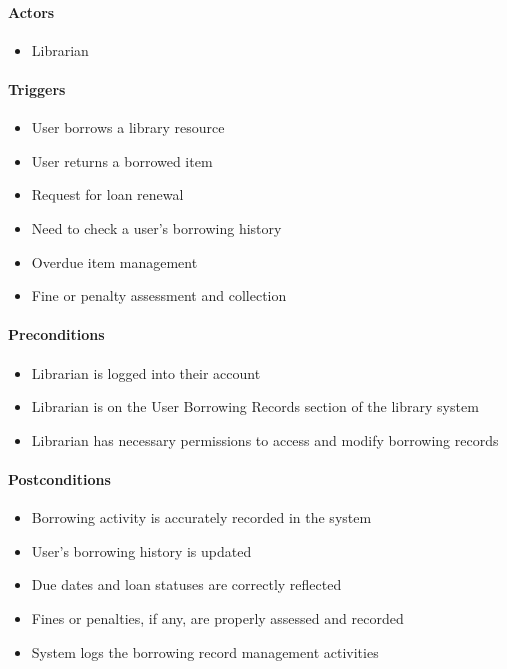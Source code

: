 \paragraph{Actors}
\begin{itemize}
    \item Librarian
\end{itemize}

\paragraph{Triggers}
\begin{itemize}
    \item User borrows a library resource
    \item User returns a borrowed item
    \item Request for loan renewal
    \item Need to check a user's borrowing history
    \item Overdue item management
    \item Fine or penalty assessment and collection
\end{itemize}

\paragraph{Preconditions}
\begin{itemize}
    \item Librarian is logged into their account
    \item Librarian is on the User Borrowing Records section of the library system
    \item Librarian has necessary permissions to access and modify borrowing records
\end{itemize}

\paragraph{Postconditions}
\begin{itemize}
    \item Borrowing activity is accurately recorded in the system
    \item User's borrowing history is updated
    \item Due dates and loan statuses are correctly reflected
    \item Fines or penalties, if any, are properly assessed and recorded
    \item System logs the borrowing record management activities
\end{itemize}

